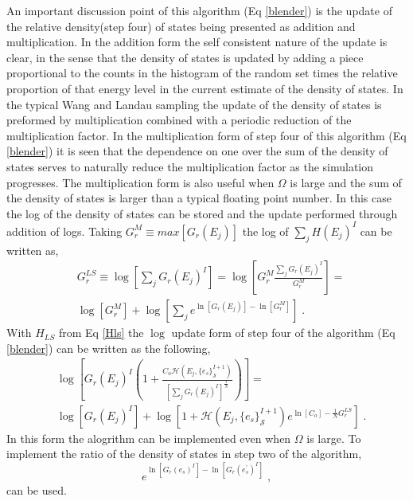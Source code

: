 \documentclass[aps,prl,reprint,superscriptaddress,showkeys]{revtex4-1}
\begin{document}
An important discussion point of this algorithm (Eq \ref{blender}) is the update of the relative density(step four) of states being presented as addition and multiplication. In the addition form the self consistent nature of the update is clear, in the sense that the  density of states is updated by adding a  piece proportional to the counts in the histogram of the random set times the relative proportion of  that energy level in the current estimate of the density of states.  In the typical Wang and Landau sampling the update of the density of states is preformed by multiplication combined with a periodic reduction of the multiplication factor. In the multiplication form of step four of this algorithm (Eq \ref{blender}) it is seen that the dependence on one over the sum of the density of states serves to naturally reduce the multiplication factor as the simulation progresses. The multiplication form is also useful when $\Omega$ is large and the sum of the density of states is larger than a typical floating point number. In this case the log of the density of states can be stored and the update performed through addition of logs. Taking $G_{r}^M \equiv  max[G_{r}(E_j)]$ the log of $\sum_j H(E_j)^{I}$ can be written as, 
\begin{equation}
\begin{split}
&G_{r}^{LS} \equiv \log[\sum_j G_{r}(E_j)^{I}] = \log[G_{r}^M \frac{\sum_j G_{r}(E_j)^{I}}{G_{r}^M}]=\\
&\log[G_{r}^M] + \log[\sum_j e^{\ln[G_{r}(E_j)] - \ln[G_{r}^M]} ] \;.
\end{split}
\label{Hls}
\end{equation} 
With $H_{LS}$ from Eq \ref{Hls} the $\log$ update form of step four of the algorithm (Eq \ref{blender}) can be written as the following, 
\begin{equation}
\begin{split}
& \log[ G_{r}(E_j)^{I}( 1 +  \frac{C_o \mathcal{H}(E_j,\{e_s\}_{\mathcal{S}}^{I+1}) }{ [\sum_j G_{r}(E_j)^{I}]^{\frac{1}{N} } } ) ]=\\
& \log[ G_{r}(E_j)^{I} ] + \log[1 +   \mathcal{H}(E_j,\{e_s\}_{\mathcal{S}}^{I+1})e^{\ln[C_o]-\frac{1}{N}G_{r}^{LS}}] \;.
\end{split}
\end{equation}
In this form  the alogrithm can be implemented even when $\Omega$ is large. To implement the ratio of the density of states in step two of the algorithm, 
\begin{equation}
e^{\ln[G_{r}(e_s)^{I}] - \ln[G_{r}(e_s^{'})^{I}]} \;,
\end{equation}
can be used.
\end{document}
